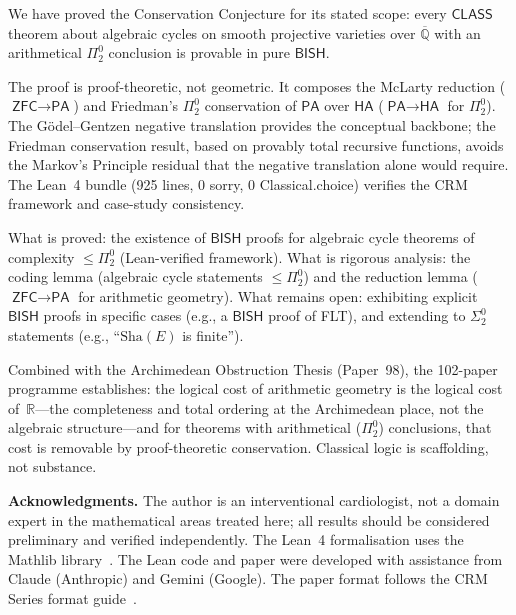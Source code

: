 \documentclass[11pt,a4paper]{article}
\theoremstyle{plain}
\theoremstyle{definition}
\newcommand{\BISH}{\textsf{BISH}}
\newcommand{\CLASS}{\textsf{CLASS}}
\newcommand{\HA}{\textsf{HA}}
\newcommand{\PA}{\textsf{PA}}
\newcommand{\ZFC}{\textsf{ZFC}}
\newcommand{\Q}{\mathbb{Q}}
\newcommand{\R}{\mathbb{R}}
\begin{document}
We have proved the Conservation Conjecture for its stated scope: every $\CLASS$ theorem about algebraic cycles on smooth projective varieties over $\overline{\Q}$ with an arithmetical $\Pi^0_2$ conclusion is provable in pure $\BISH$.

The proof is proof-theoretic, not geometric.  It composes the McLarty reduction ($\ZFC \to \PA$) and Friedman's $\Pi^0_2$ conservation of $\PA$ over $\HA$ ($\PA \to \HA$ for $\Pi^0_2$).  The G\"odel--Gentzen negative translation provides the conceptual backbone; the Friedman conservation result, based on provably total recursive functions, avoids the Markov's Principle residual that the negative translation alone would require.  The Lean~4 bundle (925 lines, 0 sorry, 0 Classical.choice) verifies the CRM framework and case-study consistency.

What is proved: the existence of $\BISH$ proofs for algebraic cycle theorems of complexity $\le \Pi^0_2$ (Lean-verified framework).  What is rigorous analysis: the coding lemma (algebraic cycle statements $\le \Pi^0_2$) and the reduction lemma ($\ZFC \to \PA$ for arithmetic geometry).  What remains open: exhibiting explicit $\BISH$ proofs in specific cases (e.g., a $\BISH$ proof of FLT), and extending to $\Sigma^0_2$ statements (e.g., ``$\mathrm{Sha}(E)$ is finite'').

Combined with the Archimedean Obstruction Thesis (Paper~98), the 102-paper programme establishes: the logical cost of arithmetic geometry is the logical cost of~$\R$---the completeness and total ordering at the Archimedean place, not the algebraic structure---and for theorems with arithmetical ($\Pi^0_2$) conclusions, that cost is removable by proof-theoretic conservation.  Classical logic is scaffolding, not substance.

\bigskip
\noindent\textbf{Acknowledgments.} The author is an interventional cardiologist, not a domain expert in the mathematical areas treated here; all results should be considered preliminary and verified independently.  The Lean~4 formalisation uses the Mathlib library~\cite{mathlib}.  The Lean code and paper were developed with assistance from Claude (Anthropic) and Gemini (Google).  The paper format follows the CRM Series format guide~\cite{lee-format-guide}.
\end{document}
